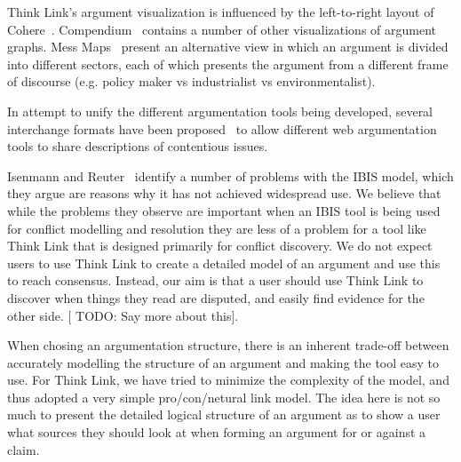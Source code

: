 \documentclass{chi2009}
\newcommand{\todo}[1]{{[\color{blue} TODO: #1]}}
\begin{document}
Think Link's argument visualization is influenced by the left-to-right layout of Cohere~\cite{Shum2008}. Compendium~\cite{Selvin2001} contains a number of other visualizations of argument graphs. Mess Maps~\cite{Horn2007} present an alternative view in which an argument is divided into different sectors, each of which presents the argument from a different frame of discourse (e.g. policy maker vs industrialist vs environmentalist).

In attempt to unify the different argumentation tools being developed, several interchange formats have been proposed~\cite{Rahwan2007a,McGinnis2007} to allow different web argumentation tools to share descriptions of contentious issues.

Isenmann and Reuter~\cite{Isenmann1997} identify a number of problems with the IBIS model, which they argue are reasons why it has not achieved widespread use. We believe that while the problems they observe are important when an IBIS tool is being used for conflict modelling and resolution they are less of a problem for a tool like Think Link that is designed primarily for conflict discovery. We do not expect users to use Think Link to create a detailed model of an argument and use this to reach consensus. Instead, our aim is that a user should use Think Link to discover when things they read are disputed, and easily find evidence for the other side.
\todo{Say more about this}.

When chosing an argumentation structure, there is an inherent trade-off between accurately modelling the structure of an argument and making the tool easy to use. For Think Link, we have tried to minimize the complexity of the model, and thus adopted a very simple pro/con/netural link model. The idea here is not so much to present the detailed logical structure of an argument as to show a user what sources they should look at when forming an argument for or against a claim.

% 
% 
% 
% 
% 
% 
\end{document}

